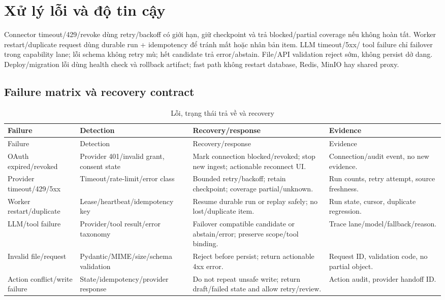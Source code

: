 \documentclass[12pt,a4paper]{article}
\begin{document}
\section{Xử lý lỗi và độ tin cậy}
Connector timeout/429/revoke dùng retry/backoff có giới hạn, giữ checkpoint và
trả blocked/partial coverage nếu không hoàn tất. Worker restart/duplicate request
dùng durable run + idempotency để tránh mất hoặc nhân bản item. LLM timeout/5xx/
tool failure chỉ failover trong capability lane; lỗi schema không retry mù; hết
candidate trả error/abstain. File/API validation reject sớm, không persist dở
dang. Deploy/migration lỗi dùng health check và rollback artifact; fast path
không restart database, Redis, MinIO hay shared proxy.

\subsection{Failure matrix và recovery contract}
\begin{longtable}{p{3.2cm}p{4.2cm}p{4.0cm}p{3.0cm}}
\caption{Lỗi, trạng thái trả về và recovery}\label{tab:sdd-failure-matrix}\\
\toprule Failure & Detection & Recovery/response & Evidence \\ \midrule
\endfirsthead
\toprule Failure & Detection & Recovery/response & Evidence \\ \midrule
\endhead
OAuth expired/revoked & Provider 401/invalid grant, consent state & Mark connection blocked/revoked; stop new ingest; actionable reconnect UI. & Connection/audit event, no new evidence. \\
Provider timeout/429/5xx & Timeout/rate-limit/error class & Bounded retry/backoff; retain checkpoint; coverage partial/unknown. & Run counts, retry attempt, source freshness. \\
Worker restart/duplicate & Lease/heartbeat/idempotency key & Resume durable run or replay safely; no lost/duplicate item. & Run state, cursor, duplicate regression. \\
LLM/tool failure & Provider/tool result/error taxonomy & Failover compatible candidate or abstain/error; preserve scope/tool binding. & Trace lane/model/fallback/reason. \\
Invalid file/request & Pydantic/MIME/size/schema validation & Reject before persist; return actionable 4xx error. & Request ID, validation code, no partial object. \\
Action conflict/write failure & State/idempotency/provider response & Do not repeat unsafe write; return draft/failed state and allow retry/review. & Action audit, provider handoff ID. \\
\bottomrule
\end{longtable}
\end{document}
